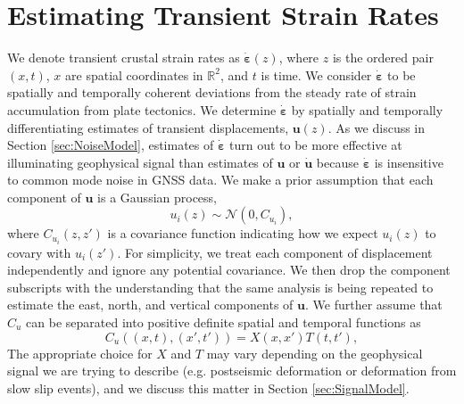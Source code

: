 \documentclass[10pt,letter]{article}
\begin{document}
\section{Estimating Transient Strain Rates}\label{sec:Method}
We denote transient crustal strain rates as $\dot{\bm{\varepsilon}}(z)$, where $z$ is the ordered pair $(x,t)$, $x$ are spatial coordinates in $\mathbb{R}^2$, and $t$ is time. We consider $\dot{\bm{\varepsilon}}$ to be spatially and temporally coherent deviations from the steady rate of strain accumulation from plate tectonics. We determine $\dot{\bm{\varepsilon}}$ by spatially and temporally differentiating estimates of transient displacements, $\bm{u}(z)$.  As we discuss in Section \ref{sec:NoiseModel}, estimates of $\dot{\bm{\varepsilon}}$ turn out to be more effective at illuminating geophysical signal than estimates of $\bm{u}$ or $\dot{\bm{u}}$ because $\dot{\bm{\varepsilon}}$ is insensitive to common mode noise in GNSS data.  We make a prior assumption that each component of $\bm{u}$ is a Gaussian process,
\begin{equation}\label{eq:TransientDeformation}
u_i(z) \sim \mathcal{N}\left(0,C_{u_i}\right),
\end{equation}
where $C_{u_i}(z,z')$ is a covariance function indicating how we expect $u_i(z)$ to covary with $u_i(z')$. For simplicity, we treat each component of displacement independently and ignore any potential covariance. We then drop the component subscripts with the understanding that the same analysis is being repeated to estimate the east, north, and vertical components of $\bm{u}$. We further assume that $C_u$ can be separated into positive definite spatial and temporal functions as 
\begin{equation}\label{eq:TransientCovariance}
C_{u}\left((x,t),(x',t')\right) = X(x,x')T(t,t'),
\end{equation}  
The appropriate choice for $X$ and $T$ may vary depending on the geophysical signal we are trying to describe (e.g. postseismic deformation or deformation from slow slip events), and we discuss this matter in Section \ref{sec:SignalModel}.  
\end{document}
